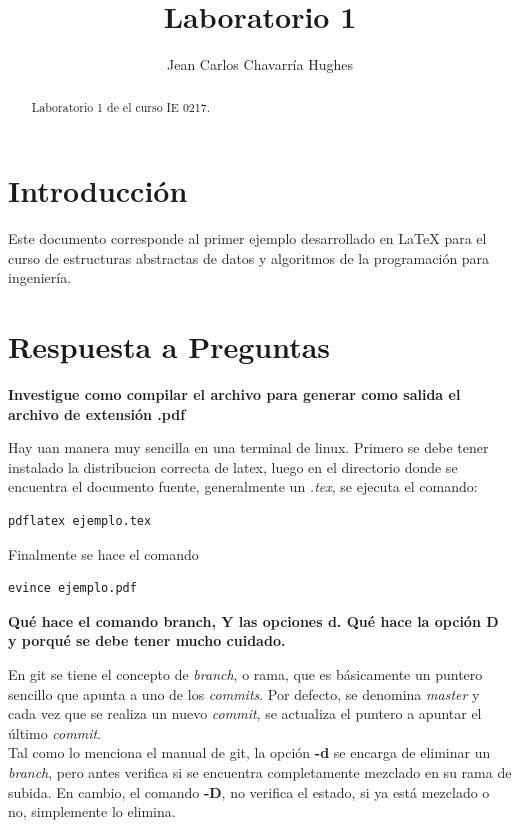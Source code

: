 \documentclass{article}
\begin{document}
\title{Laboratorio 1}
\author{Jean Carlos Chavarr\' ia Hughes}
\maketitle
\begin{abstract}
Laboratorio 1 de el curso IE 0217.
\end{abstract}
\section{Introducci\' on}
Este documento corresponde al primer ejemplo desarrollado en LaTeX para el curso de estructuras abstractas de datos y algoritmos de la programaci\' on para ingenier\' ia.

\section{Respuesta a Preguntas}
\textbf{Investigue como compilar el archivo para generar como salida el archivo de extensi\' on .pdf}

Hay uan manera muy sencilla en una terminal de linux. Primero se debe tener instalado la distribucion correcta de latex, luego en el directorio donde se encuentra el documento fuente, generalmente un \textit{.tex}, se ejecuta el comando: 

\begin{verbatim}
pdflatex ejemplo.tex
\end{verbatim}

Finalmente se hace el comando

\begin{verbatim}
evince ejemplo.pdf
\end{verbatim}

\textbf{Qu\' e hace el comando branch, Y las opciones d. Qu\' e hace la opci\' on D y porqu\' e se debe tener mucho cuidado.}

En git se tiene el concepto de \textit{branch}, o rama, que es b\' asicamente un puntero sencillo que apunta a uno de los \textit{commits}. 
Por defecto, se denomina \textit{master} y cada vez que se realiza un nuevo \textit{commit}, se actualiza el puntero a apuntar el \' ultimo \textit{commit}.\\

Tal como lo menciona el manual de git, la opci\' on \textbf{-d} se encarga de 
eliminar un \textit{branch}, pero antes verifica si se encuentra completamente mezclado en su rama de subida. En cambio, el comando \textbf{-D}, no verifica el estado, si ya est\' a mezclado o no, simplemente lo elimina.\\
\end{document}
